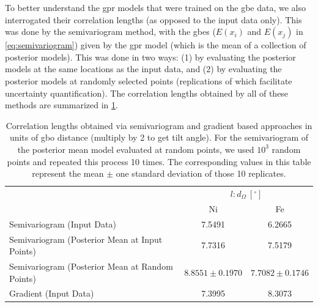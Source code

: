 \documentclass[final,twocolumn,12pt]{elsarticle}
\begin{document}
	To better understand the \gls{gpr} models that were trained on the \gls{gbe} data, we also interrogated their correlation lengths (as opposed to the input data only). This was done by the semivariogram method, with the \glspl{gbe} ($E\left(x_i\right)$ and $E\left(x_j\right)$ in \cref{eq:semivariogram}) given by the \gls{gpr} model (which is the mean of a collection of posterior models). This was done in two ways: (1) by evaluating the posterior models at the same locations as the input data, and (2) by evaluating the posterior models at randomly selected points (replications of which facilitate uncertainty quantification). The correlation lengths obtained by all of these methods are summarized in \cref{tab:globalcorrelationlengths}.
	\begin{table}[]
	    \centering
	    \caption{Correlation lengths obtained via semivariogram and gradient based approaches in units of \gls{gbo} distance (multiply by 2 to get tilt angle). For the semivariogram of the posterior mean model evaluated at random points, we used $10^3$ random points and repeated this process 10 times. The corresponding values in this table represent the mean $\pm$ one standard deviation of those 10 replicates.}
	    \label{tab:globalcorrelationlengths}
	    \begin{tabular}{l c c}
	    \toprule
	         & \multicolumn{2}{c}{$l: d_\Omega\ [{}^{\circ}]$} \\
	         \cline{2-3}
	         & Ni & Fe \rule{0pt}{2.6ex}\\
	         \midrule
	         Semivariogram (Input Data) & 7.5491 & 6.2665 \\
	         Semivariogram (Posterior Mean at Input Points) & 7.7316 & 7.5179 \\ 
	         Semivariogram (Posterior Mean at Random Points) & $8.8551 \pm 0.1970$ & $7.7082 \pm 0.1746$ \\
	         Gradient (Input Data) & 7.3995 & 8.3073 \\
	         \bottomrule
	    \end{tabular}
	\end{table}
	
\end{document}
